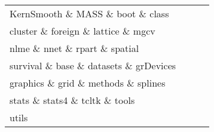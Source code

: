 \begin{tabular}{llll} 
KernSmooth \& MASS \& boot \& class\\ 
cluster \& foreign \& lattice \& mgcv\\ 
nlme \& nnet \& rpart \& spatial\\ 
survival \& base \& datasets \& grDevices\\ 
graphics \& grid \& methods \& splines\\ 
stats \& stats4 \& tcltk \& tools\\ 
utils  &   &   &   \\ 
\end{tabular}
